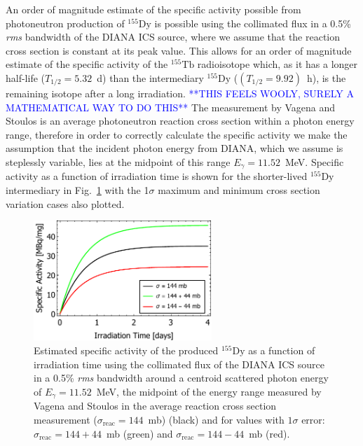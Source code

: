 An order of magnitude estimate of the specific activity possible from  photoneutron production of $^{155}\mathrm{Dy}$ is possible using the collimated flux in a 0.5\% \textit{rms}  bandwidth of the DIANA ICS source, where we assume that the reaction cross section is constant at its peak value. This allows for an order of magnitude estimate of the specific activity of the $^{155}\mathrm{Tb}$ radioisotope which, as it has a longer half-life ($T_{1/2} = 5.32$~\si{\day}) than the intermediary $^{155}\mathrm{Dy}$ ($\left(T_{1/2} = 9.92\right)$~\si{\hour}), is the remaining isotope after a long irradiation. \textcolor{blue}{**THIS FEELS WOOLY, SURELY A MATHEMATICAL WAY TO DO THIS**} The measurement by Vagena and Stoulos \cite{vagena2017photodisintegration} is an average photoneutron reaction cross section within a photon energy range, therefore in order to correctly calculate the specific activity we make the assumption that the incident photon energy from DIANA, which we assume is steplessly variable, lies at the midpoint of this range $E_{\gamma} = 11.52$~\si{\mega\electronvolt}. Specific activity as a function of irradiation time is shown for the shorter-lived $^{155}\mathrm{Dy}$ intermediary in Fig.~\ref{fig:155Dy_specific_activity} with the 1$\sigma$ maximum and minimum cross section variation cases also plotted.
\begin{figure}[!h]
\centering
\includegraphics[width=0.6\textwidth]{Figures/DIANA_Inverse_Compton_Source_Design/155Dy_specific_activity.pdf}
\caption{Estimated specific activity of the produced $^{155}\mathrm{Dy}$ as a function of irradiation time using the collimated flux of the DIANA ICS source in a 0.5\% \textit{rms} bandwidth around a centroid scattered photon energy of $E_{\gamma} = 11.52$~\si{\mega\electronvolt}, the midpoint of the energy range measured by Vagena and Stoulos \cite{vagena2017photodisintegration} in the average reaction cross section measurement ($\sigma_{\mathrm{reac}} = 144$~\si{\milli\barn}) (black) and for values with $1\sigma$ error: $\sigma_{\mathrm{reac}} = 144 + 44$~\si{\milli\barn} (green) and $\sigma_{\mathrm{reac}} = 144 - 44$~\si{\milli\barn} (red).} 
\label{fig:155Dy_specific_activity}
\end{figure}
